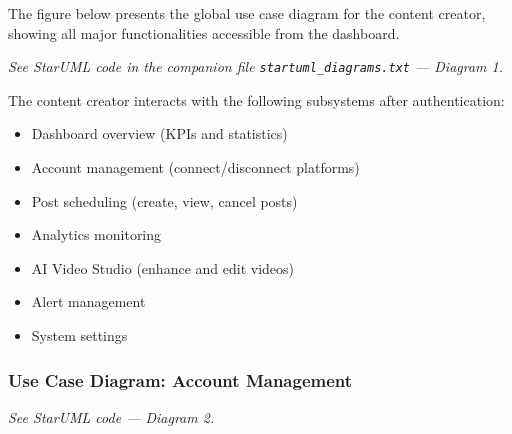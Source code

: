 The figure below presents the global use case diagram for the content creator, showing all major functionalities accessible from the dashboard.


\noindent\textit{See StarUML code in the companion file \texttt{startuml\_diagrams.txt} --- Diagram 1.}

\vspace{0.5cm}

The content creator interacts with the following subsystems after authentication:
\begin{itemize}
    \item Dashboard overview (KPIs and statistics)
    \item Account management (connect/disconnect platforms)
    \item Post scheduling (create, view, cancel posts)
    \item Analytics monitoring
    \item AI Video Studio (enhance and edit videos)
    \item Alert management
    \item System settings
\end{itemize}

\subsubsection*{Use Case Diagram: Account Management}


\noindent\textit{See StarUML code --- Diagram 2.}

